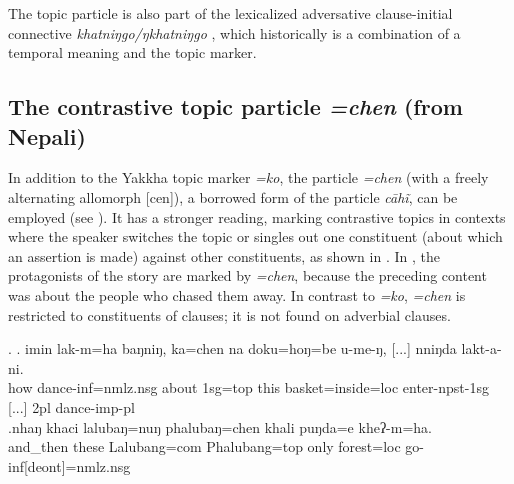 The topic particle is also part of the lexicalized adversative clause-initial connective \emph{khatniŋgo/ŋkhatniŋgo} , which historically is a combination of a temporal  meaning  and the topic marker.

\subsection{The contrastive topic particle \emph{=chen} (from {Nepali})}

In addition to the Yakkha topic marker \emph{=ko}, the particle \emph{=chen} (with a freely alternating allomorph  [cen]), a borrowed form of  the  particle \emph{cāhĩ}, can be employed (see ).  It has a stronger reading, marking contrastive topics  in contexts where the speaker switches the topic or singles out one constituent (about which an assertion is made) against other constituents, as shown in \Next[a]. In \Next[b], the protagonists of the story are marked by \emph{=chen}, because the preceding content was about the people who chased them away.
In contrast to \emph{=ko},  \emph{=chen} is restricted to constituents of clauses; it is not found on adverbial clauses. 

\ex. \ag. imin lak-m=ha baŋniŋ, ka=chen  na doku=hoŋ=be        u-me-ŋ, [...] nniŋda lakt-a-ni.\\
how dance{\sc -inf=nmlz.nsg} about {\sc 1sg=top} this basket{\sc =inside=loc} enter{\sc -npst-1sg} [...] {\sc 2pl} dance{\sc -imp-pl}\\
\bg.nhaŋ khaci     lalubaŋ=nuŋ   phalubaŋ=chen khali puŋda=e     kheʔ-m=ha.\\
and\_then these Lalubang{\sc =com} Phalubang{\sc =top} only forest{\sc =loc} go{\sc -inf[deont]=nmlz.nsg}\\
 
